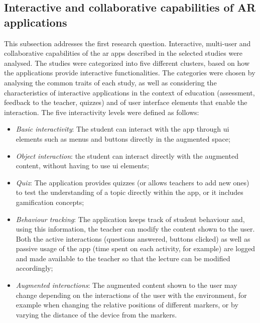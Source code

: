 \begin{figure}[htbp]	
	\begin{center}
	
	\captionsetup{font=small}
	\caption{\fontsize{10pt}{11pt}}
	\label{fig:software}
    \end{center}
\end{figure}

\subsection{Interactive and collaborative capabilities of AR applications}\label{sota:results:RQ1}

This subsection addresses the first research question. Interactive, multi-user and collaborative capabilities of the \gls{ar} apps described in the selected studies were analysed. The studies were categorized into five different clusters, based on how the applications provide interactive functionalities. The categories were chosen by analysing the common traits of each study, as well as considering the characteristics of interactive applications in the context of education (assessment, feedback to the teacher, quizzes) and of user interface elements that enable the interaction. The five interactivity levels were defined as follows:

\begin{itemize}
    \item \emph{Basic interactivity}: The student can interact with the app through \gls{ui} elements such as menus and buttons directly in the augmented space;
    \item \emph{Object interaction}: the student can interact directly with the augmented content, without having to use \gls{ui} elements;
    \item \emph{Quiz}: The application provides quizzes (or allows teachers to add new ones) to test the understanding of a topic directly within the app, or it includes gamification concepts;
    \item \emph{Behaviour tracking}: The application keeps track of student behaviour and, using this information, the teacher can modify the content shown to the user. Both the active interactions (questions answered, buttons clicked) as well as passive usage of the app (time spent on each activity, for example) are logged and made available to the teacher so that the lecture can be modified accordingly;
    \item \emph{Augmented interactions}: The augmented content shown to the user may change depending on the interactions of the user with the environment, for example when changing the relative positions of different markers, or by varying the distance of the device from the markers.
\end{itemize}

